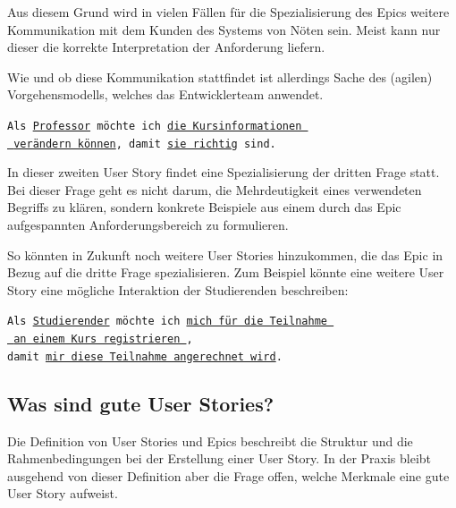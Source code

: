 \documentclass[acmtog]{acmart}
\begin{document}
Aus diesem Grund wird in vielen Fällen für die Spezialisierung des Epics weitere Kommunikation
mit dem Kunden des Systems von Nöten sein.
Meist kann nur dieser die korrekte Interpretation der Anforderung liefern.

Wie und ob diese Kommunikation stattfindet ist allerdings Sache des (agilen) Vorgehensmodells, welches
das Entwicklerteam anwendet.

\vspace{1em}
\texttt{Als \underline{Professor} möchte ich \underline{die Kursinformationen }\\
	\hspace*{4.5em} \underline{ verändern können}, damit \underline{sie richtig} sind.}
\vspace{1em}

In dieser zweiten User Story findet eine Spezialisierung der dritten Frage statt.
Bei dieser Frage geht es nicht darum, die Mehrdeutigkeit eines verwendeten Begriffs zu klären,
sondern konkrete Beispiele aus einem durch das Epic aufgespannten Anforderungsbereich
zu formulieren.

So könnten in Zukunft noch weitere User Stories hinzukommen, die das Epic in Bezug auf die dritte
Frage spezialisieren.
Zum Beispiel könnte eine weitere User Story eine mögliche Interaktion der Studierenden beschreiben:

\vspace{1em}
\texttt{Als \underline{Studierender} möchte ich \underline{mich für die Teilnahme }\\
	\hspace*{2em}\underline{ an einem Kurs registrieren },\\
	\hspace*{4em}damit \underline{mir diese Teilnahme angerechnet wird}.}
\vspace{1em}

\subsection{Was sind gute User Stories?}
Die Definition von User Stories und Epics beschreibt die Struktur und die Rahmenbedingungen bei der Erstellung einer User Story.
In der Praxis bleibt ausgehend von dieser Definition aber die Frage offen, welche Merkmale eine gute User Story aufweist.
\end{document}
